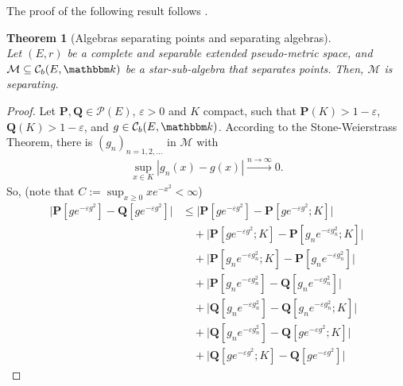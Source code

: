 \documentclass{article}
\newtheorem{theorem}{Theorem}
\theoremstyle{definition}
\theoremstyle{step} \newtheorem{step}{Step}
\begin{document}
\begin{paracol}{2}
  \switchcolumn*

  The proof of the following result follows
  \cite[Theorem~3.4.5]{EthierKurtz1986}.

  \begin{theorem}[Algebras separating points and separating algebras]
    \label{T:wc3}\mbox{}\\ \sloppy Let $(E,r)$ be a complete and separable extended pseudo-metric space, and
    $\mathcal M \subseteq\mathcal C_b(E,\mathbbm k)$ be a
    star-sub-algebra that separates points. Then, $\mathcal M$ is
    separating.
  \end{theorem}

  \begin{proof}
    Let $\mathbf P, \mathbf Q\in\mathcal P(E)$, $\varepsilon>0$ and $K$
    compact, such that $\mathbf P(K)>1-\varepsilon$, $\mathbf
      Q(K)>1-\varepsilon$, and $g \in \mathcal C_b(E,\mathbbm k)$. According to the
    Stone-Weierstrass Theorem, there is $(g_n)_{n=1,2,\dots}$ in
    $\mathcal M$ with
    \begin{align}
      \label{eq:wc9}
      \sup_{x\in K} |g_n(x) - g(x)| \xrightarrow{n\to\infty} 0.
    \end{align}
    So, (note that $C := \sup_{x\geq 0} xe^{-x^2} < \infty$)
    \begin{align*}
      \big|\mathbf P[ge^{-\varepsilon g^2}] - \mathbf Q[ge^{-\varepsilon
      g^2}] \big| & \leq \big|\mathbf P[ge^{-\varepsilon g^2}] -
      \mathbf P[ge^{-\varepsilon g^2};K] \big|                   \\ & \quad {} + \big|\mathbf
      P[ge^{-\varepsilon g^2};K] - \mathbf P[g_ne^{-\varepsilon
      g_n^2};K] \big|                                            \\ & \quad {} + \big| \mathbf P[g_ne^{-\varepsilon
      g_n^2};K] - \mathbf P[g_ne^{-\varepsilon g_n^2}] \big|     \\ &
      \quad {} + |\mathbf P[g_ne^{-\varepsilon g_n^2}] - \mathbf
      Q[g_ne^{-\varepsilon g_n^2}] \big|                         \\ & \quad {} + \big|\mathbf
      Q[g_ne^{-\varepsilon g_n^2}] - \mathbf Q[g_ne^{-\varepsilon
      g_n^2};K] \big|                                            \\ & \quad {}  + \big|\mathbf Q[g_ne^{-\varepsilon
      g_n^2}] - \mathbf Q[ge^{-\varepsilon g^2};K] \big|         \\ & \quad{} {}  +
      \big|\mathbf Q[ge^{-\varepsilon g^2};K] - \mathbf
      Q[ge^{-\varepsilon g^2}] \big|

\end{align*}
\end{proof}
\end{paracol}
\end{document}
